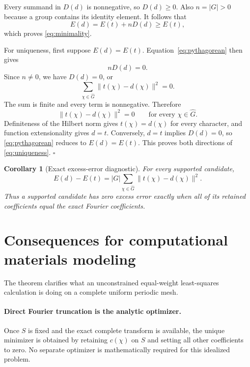 \documentclass[11pt]{article}
\newtheorem{corollary}{Corollary}
\begin{document}
Every summand in $D(d)$ is nonnegative, so $D(d)\ge0$.  Also $n=|G|>0$ because a group contains its
identity element.  It follows that
\begin{equation}
  E(d)=E(t)+nD(d)\ge E(t),
\end{equation}
which proves \eqref{eq:minimality}.

For uniqueness, first suppose $E(d)=E(t)$.  Equation~\eqref{eq:pythagorean} then gives
\begin{equation}
  nD(d)=0.
  \label{eq:product-zero}
\end{equation}
Since $n\ne0$, we have $D(d)=0$, or
\begin{equation}
  \sum_{\chi\in\widehat G}\|t(\chi)-d(\chi)\|^2=0.
  \label{eq:sum-zero}
\end{equation}
The sum is finite and every term is nonnegative.  Therefore
\[
  \|t(\chi)-d(\chi)\|^2=0
  \qquad\text{for every }\chi\in\widehat G.
\]
Definiteness of the Hilbert norm gives $t(\chi)=d(\chi)$ for every character, and function
extensionality gives $d=t$.  Conversely, $d=t$ implies $D(d)=0$, so
\eqref{eq:pythagorean} reduces to $E(d)=E(t)$.  This proves both directions of
\eqref{eq:uniqueness}. \hfill$\square$

\begin{corollary}[Exact excess-error diagnostic]
For every supported candidate,
\begin{equation}
  E(d)-E(t)=|G|\sum_{\chi\in\widehat G}\|t(\chi)-d(\chi)\|^2.
\end{equation}
Thus a supported candidate has zero excess error exactly when all of its retained coefficients
equal the exact Fourier coefficients.
\end{corollary}

\section{Consequences for computational materials modeling}
The theorem clarifies what an unconstrained equal-weight least-squares calculation is doing on a
complete uniform periodic mesh.

\paragraph{Direct Fourier truncation is the analytic optimizer.}
Once $S$ is fixed and the exact complete transform is available, the unique minimizer is obtained
by retaining $c(\chi)$ on $S$ and setting all other coefficients to zero.  No separate optimizer is
mathematically required for this idealized problem.
\end{document}
